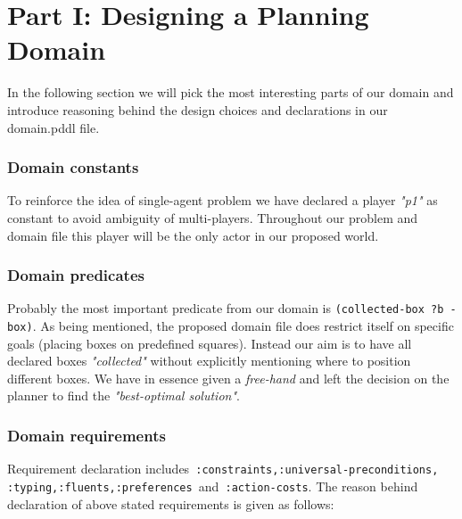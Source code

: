 \documentclass[letterpaper]{article} %
\begin{document}
\section{Part I: Designing a Planning Domain}
In the following section we will pick the most interesting parts of our domain and introduce reasoning behind the design choices and declarations in our domain.pddl file. 

\subsubsection{Domain constants}
To reinforce the idea of single-agent problem we have declared a player \emph{"p1"} as constant to avoid ambiguity of multi-players. Throughout our problem and domain file this player will be the only actor in our proposed world. 

\subsubsection{Domain predicates}
Probably the most important predicate from our domain is \texttt{(collected-box ?b -box)}. As being mentioned, the proposed domain file does restrict itself on specific goals (placing boxes on predefined squares). Instead our aim is to have all declared boxes \emph{"collected"} without explicitly mentioning where to position different boxes. We have in essence given a \emph{free-hand} and left the decision on the planner to find the \emph{"best-optimal solution"}. 

\subsubsection{Domain requirements}
Requirement declaration includes\texttt{ :constraints,:universal-preconditions, :typing,:fluents,:preferences }and\texttt{ :action-costs}. The reason behind declaration of above stated requirements is given as follows:
\end{document}
